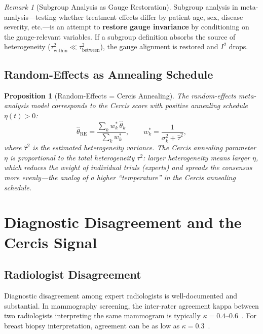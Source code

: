 \documentclass[12pt,a4paper]{article}
\newtheorem{proposition}[theorem]{Proposition}
\theoremstyle{remark}
\newtheorem{remark}[theorem]{Remark}
\newcommand{\Cercis}{\textsf{Cercis}}
\begin{document}
\begin{remark}[Subgroup Analysis as Gauge Restoration]
\label{rem:subgroup_gauge}
Subgroup analysis in meta-analysis---testing whether treatment effects differ
by patient age, sex, disease severity, etc.---is an attempt to
\textbf{restore gauge invariance} by conditioning on the gauge-relevant
variables. If a subgroup definition absorbs the source of heterogeneity
($\tau^2_{\text{within}} \ll \tau^2_{\text{between}}$), the gauge
alignment is restored and $I^2$ drops.
\end{remark}

\subsection{Random-Effects as Annealing Schedule}

\begin{proposition}[Random-Effects = Cercis Annealing]
\label{prop:random_effects}
The random-effects meta-analysis model corresponds to the \Cercis{}
score with positive annealing schedule $\eta(t) > 0$:
\begin{equation}
  \hat{\theta}_{\text{RE}} = \frac{\sum_k w_k^* \,\hat{\theta}_k}
  {\sum_k w_k^*},
  \qquad w_k^* = \frac{1}{\sigma_k^2 + \hat{\tau}^2},
\end{equation}
where $\hat{\tau}^2$ is the estimated heterogeneity variance. The
\Cercis{} annealing parameter $\eta$ is proportional to the total
heterogeneity $\tau^2$: larger heterogeneity means larger $\eta$, which
reduces the weight of individual trials (experts) and spreads the consensus
more evenly---the analog of a higher ``temperature'' in the Cercis
annealing schedule.
\end{proposition}


\section{Diagnostic Disagreement and the Cercis Signal}
\label{sec:diagnostic}

\subsection{Radiologist Disagreement}

Diagnostic disagreement among expert radiologists is well-documented and
substantial. In mammography screening, the inter-rater agreement kappa
between two radiologists interpreting the same mammogram is typically
$\kappa = 0.4$--$0.6$~\cite{elmore1994does, beam1996variability}.
For breast biopsy interpretation, agreement can be as low as $\kappa =
0.3$~\cite{elmore2015diagnostic}.
\end{document}
